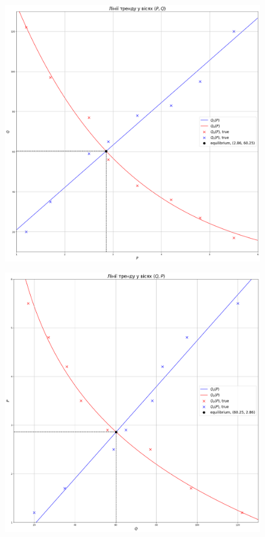 \begin{figure}[H]
	\centering
	\includegraphics[width=\textwidth]{p_q.png}
\end{figure}

\begin{figure}[H]
	\centering
	\includegraphics[width=\textwidth]{q_p.png}
\end{figure}

